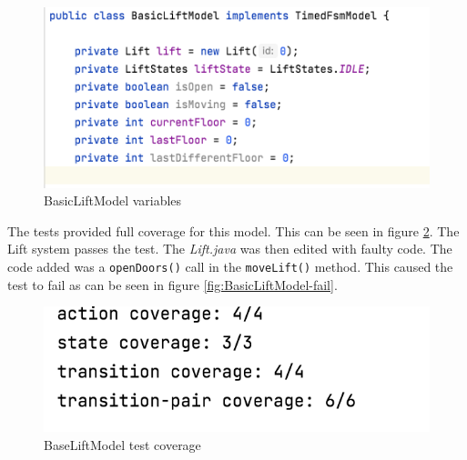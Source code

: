 \documentclass[a4paper, 12pt]{article}
\begin{document}
\begin{figure}[h]
   \centering
   \includegraphics[width=\textwidth,height=\textheight,keepaspectratio]{images/BasicLiftModel-variables} %
   \caption{BasicLiftModel variables}
   \label{fig:BasicLiftModel-variables}
\end{figure}

The tests provided full coverage for this model. This can be seen in figure \ref{fig:BaseLiftModel-coverage}. The Lift system passes the test. The \textit{Lift.java} was then edited with faulty code. The code added was a \texttt{openDoors()} call in the \texttt{moveLift()} method. This caused the test to fail as can be seen in figure \ref{fig:BasicLiftModel-fail}. \\

\begin{figure}[h]
   \centering
   \includegraphics[width=\textwidth,height=\textheight,keepaspectratio]{images/BaseLiftModel-coverage} %
   \caption{BaseLiftModel test coverage}
   \label{fig:BaseLiftModel-coverage}
\end{figure}
\end{document}
